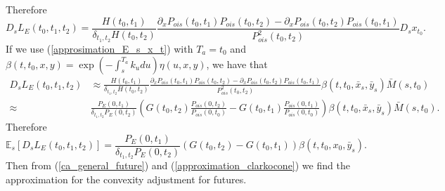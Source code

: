 \documentclass[a4paper,10pt]{article}
\newcommand{\1}{\mathbf{1}}
\begin{document}
Therefore
\begin{equation}\label{malliavin_derive_L}
D_s L_{E}(t_0,t_1,t_2) = \frac{H(t_0,t_1)}{\delta_{t_1,t_2}H(t_0,t_2)}\frac{\partial_{x}P_{ois}(t_0,t_1)P_{ois}(t_0,t_2) - \partial_{x}P_{ois}(t_0,t_2) P_{ois}(t_0,t_1) }{P^{2}_{ois}(t_0,t_2)} D_s x_{t_0}.
\end{equation}
If we use (\ref{approsimation_E_s_x_t}) with $T_a=t_0$ and $\beta(t,t_0,x,y) = \exp\left(-\int_{s}^{T_a}k_u du \right) \eta(u,x,y)$, we have that
\begin{align*}
D_s L_{E}(t_0,t_1,t_2) &\approx \frac{H(t_0,t_1)}{\delta_{t_1,t_2}H(t_0,t_2)}\frac{\partial_{x}P_{ois}(t_0,t_1)P_{ois}(t_0,t_2) - \partial_{x}P_{ois}(t_0,t_2) P_{ois}(t_0,t_1)}{P^{2}_{ois}(t_0,t_2)} \beta(t,t_0,\bar{x}_s,\bar{y}_s)\bar{M}(s,t_0) \nonumber \\
\approx& \frac{P_{E}(0,t_1)}{\delta_{t_1,t_2} P_{E}(0,t_2)} \left(G(t_0,t_2) \frac{P_{ois}(0,t_2)}{P_{ois}(0,t_0)} - G(t_0,t_1) \frac{P_{ois}(0,t_1)}{P_{ois}(0,t_0)} \right)\beta(t,t_0,\bar{x}_s,\bar{y}_s)\bar{M}(s,t_0).
\end{align*}
Therefore
\begin{equation}\label{approximation_clarkocone}
\mathbb{E}_s\left[ D_s L_{E}(t_0,t_1,t_2) \right] = \frac{P_{E}(0,t_1)}{\delta_{t_1,t_2} P_{E}(0,t_2)} \left(G(t_0,t_2)  - G(t_0,t_1)\right)\beta(t,t_0,x_0,\bar{y}_s).
\end{equation}
Then from (\ref{ca_general_future}) and (\ref{approximation_clarkocone}) we find the approximation for the convexity adjustment for futures.
\end{document}
